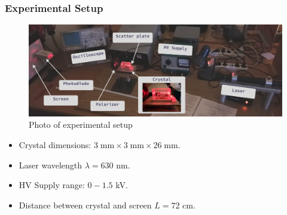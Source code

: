 \documentclass{beamer}
\begin{document}
	\begin{frame}
		\frametitle{Experimental Setup}
		
		\begin{figure}
			\centering
			\includegraphics[width=1.0\linewidth]{res/setup1.png}
			\caption{Photo of experimental setup}
		\end{figure}
	
	\begin{itemize}
		\item Crystal dimensions: $3 \; \text{mm} \times 3 \; \text{mm} \times 26 \; \text{mm}$.
		\item Laser wavelength $\lambda = 630$ nm.
		\item HV Supply range: $0 - 1.5$ kV.
		\item Distance between crystal and screen $L = 72$ cm.
	\end{itemize}
		
				
	\end{frame}
\end{document}
